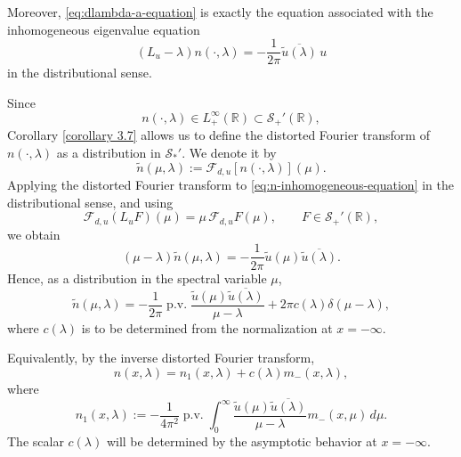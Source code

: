 \documentclass[10pt]{article}
\numberwithin{equation}{section}
\numberwithin{theorem}{section}
\begin{document}
Moreover, \eqref{eq:dlambda-a-equation} is exactly the equation associated with
the inhomogeneous eigenvalue equation
\begin{equation}
\label{eq:n-inhomogeneous-equation}
(L_u-\lambda)n(\cdot,\lambda)
=
-\frac1{2\pi}
\overline{\widetilde u(\lambda)}\,u
\end{equation}
in the distributional sense.

Since
\[
n(\cdot,\lambda)\in L^\infty_+(\mathbb R)
\subset \mathcal S_+'(\mathbb R),
\]
Corollary \ref{corollary 3.7} allows us to define the distorted Fourier transform of
\(n(\cdot,\lambda)\) as a distribution in \(\mathcal S_*'\). We denote it by
\[
\widetilde n(\mu,\lambda):=\mathcal F_{d,u}[n(\cdot,\lambda)](\mu).
\]
Applying the distorted Fourier transform to \eqref{eq:n-inhomogeneous-equation} in the
distributional sense, and using
\[
\mathcal F_{d,u}(L_uF)(\mu)
=
\mu\,\mathcal F_{d,u}F(\mu),
\qquad F\in\mathcal S_+'(\mathbb R),
\]
we obtain
\begin{equation}
\label{eq:n-spectral-equation}
(\mu-\lambda)\widetilde n(\mu,\lambda)
=
-\frac1{2\pi}
\widetilde u(\mu)\overline{\widetilde u(\lambda)}.
\end{equation}
Hence, as a distribution in the spectral variable \(\mu\),
\begin{equation}
\label{eq:n-spectral-distribution}
\widetilde n(\mu,\lambda)
=
-\frac1{2\pi}
\operatorname{p.v.}
\frac{\widetilde u(\mu)\overline{\widetilde u(\lambda)}}{\mu-\lambda}
+
2\pi c(\lambda)\delta(\mu-\lambda),
\end{equation}
where \(c(\lambda)\) is to be determined from the normalization at \(x=-\infty\).

Equivalently, by the inverse distorted Fourier transform,
\begin{equation}
\label{3.51}
n(x,\lambda)
=
n_1(x,\lambda)+c(\lambda)m_-(x,\lambda),
\end{equation}
where
\begin{equation}
\label{eq:n1-definition}
n_1(x,\lambda)
:=
-\frac1{4\pi^2}
\operatorname{p.v.}\int_0^\infty
\frac{\widetilde u(\mu)\overline{\widetilde u(\lambda)}}{\mu-\lambda}
m_-(x,\mu)\,d\mu .
\end{equation}
The scalar \(c(\lambda)\) will be determined by the asymptotic behavior at
\(x=-\infty\).
\end{document}
